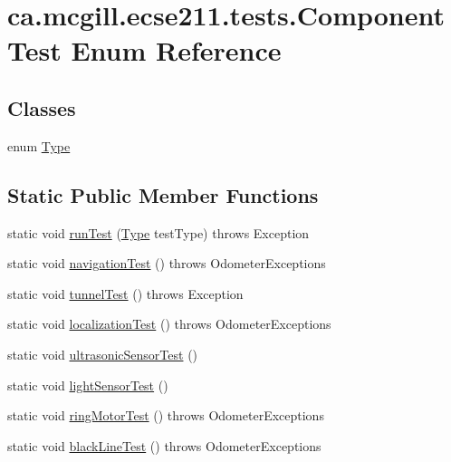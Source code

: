 \hypertarget{enumca_1_1mcgill_1_1ecse211_1_1tests_1_1_component_test}{}\section{ca.\+mcgill.\+ecse211.\+tests.\+Component\+Test Enum Reference}
\label{enumca_1_1mcgill_1_1ecse211_1_1tests_1_1_component_test}
\subsection*{Classes}
\begin{DoxyCompactItemize}
\item 
enum \hyperlink{enumca_1_1mcgill_1_1ecse211_1_1tests_1_1_component_test_1_1_type}{Type}
\end{DoxyCompactItemize}
\subsection*{Static Public Member Functions}
\begin{DoxyCompactItemize}
\item 
static void \hyperlink{enumca_1_1mcgill_1_1ecse211_1_1tests_1_1_component_test_a5dc8bf97bc48adf5bee88d425a1a974e}{run\+Test} (\hyperlink{enumca_1_1mcgill_1_1ecse211_1_1tests_1_1_component_test_1_1_type}{Type} test\+Type)  throws Exception 
\item 
static void \hyperlink{enumca_1_1mcgill_1_1ecse211_1_1tests_1_1_component_test_aa40592bb550b3526402faddbc0d890c7}{navigation\+Test} ()  throws Odometer\+Exceptions 
\item 
static void \hyperlink{enumca_1_1mcgill_1_1ecse211_1_1tests_1_1_component_test_ae85caa20c6391bacc4fdbd411ee3f113}{tunnel\+Test} ()  throws Exception 
\item 
static void \hyperlink{enumca_1_1mcgill_1_1ecse211_1_1tests_1_1_component_test_ad11712dd74c5c64e84cd71186a59a087}{localization\+Test} ()  throws Odometer\+Exceptions 
\item 
static void \hyperlink{enumca_1_1mcgill_1_1ecse211_1_1tests_1_1_component_test_a05cd9d95458b11ed57ca001a28fffa7c}{ultrasonic\+Sensor\+Test} ()
\item 
static void \hyperlink{enumca_1_1mcgill_1_1ecse211_1_1tests_1_1_component_test_a3e8288f482b3806a0f3c4668951f3e36}{light\+Sensor\+Test} ()
\item 
static void \hyperlink{enumca_1_1mcgill_1_1ecse211_1_1tests_1_1_component_test_a1ecca45b47067d825683cf46dcf22b62}{ring\+Motor\+Test} ()  throws Odometer\+Exceptions 
\item 
static void \hyperlink{enumca_1_1mcgill_1_1ecse211_1_1tests_1_1_component_test_a3f36cee9ca567c845377bec33554ba8b}{black\+Line\+Test} ()  throws Odometer\+Exceptions 
\end{DoxyCompactItemize}


